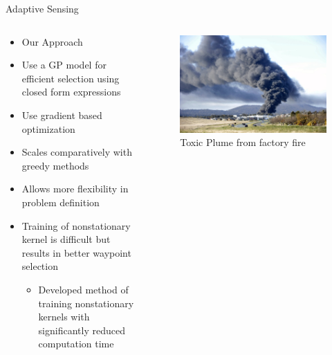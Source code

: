 \documentclass[11pt,mathserif]{beamer}
\begin{document}
\begin{frame}[t]{Adaptive Sensing}
\begin{columns}[T]
	\begin{column}{.5\textwidth}
	\begin{itemize}	\itemsep 0.1in
	\item Our Approach
\bi
		\item Use a GP model for efficient selection using closed form expressions 
		\item Use gradient based optimization 
\bi
			\item Scales comparatively with greedy methods
			\item Allows more flexibility in problem definition
\ei
                \item Training of nonstationary kernel is difficult but results in better waypoint selection 
	\begin{itemize}
                  \item Developed method of training nonstationary
                    kernels with significantly reduced computation time
		\end{itemize}
\ei

	
	\end{itemize}
	\end{column}
	
	\begin{column}{.5\textwidth}
\begin{figure}
	\includegraphics[width=\columnwidth]{figures/plume}
\caption{Toxic Plume from factory fire}
\end{figure}
	\end{column}		
\end{columns}
\end{frame}
\end{document}
